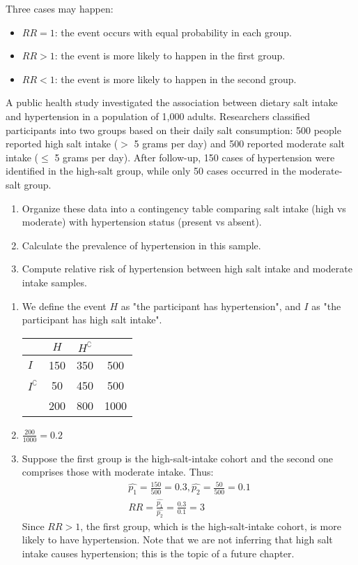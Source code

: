Three cases may happen:
\begin{itemize}
	\item \( RR = 1 \): the event occurs with equal probability in each group.
	\item \( RR > 1 \): the event is more likely to happen in the first group.
	\item \( RR < 1 \): the event is more likely to happen in the second group.
\end{itemize}

\begin{exmp}
	A public health study investigated the association between dietary salt intake and hypertension in a population of 1,000 adults.
	Researchers classified participants into two groups based on their daily salt consumption:
	500 people reported high salt intake (\(>\) 5 grams per day) and 500 reported moderate salt intake (\(\leq\) 5 grams per day).
	After follow-up, 150 cases of hypertension were identified in the high-salt group,
	while only 50 cases occurred in the moderate-salt group.
	\begin{enumerate}
		\item Organize these data into a contingency table comparing salt intake (high vs moderate) with hypertension status (present vs absent).
		\item Calculate the prevalence of hypertension in this sample.
		\item Compute relative risk of hypertension between high salt intake and moderate intake samples.
	\end{enumerate}
\end{exmp}
\begin{solution}
	\begin{enumerate}
        \item We define the event \( H \) as "the participant has hypertension", and \( I \) as "the participant has high salt intake".
		\begin{center}
		\begin{tabular}{l|cc|c}
							& \( H \) & \( H^\complement \) &  \\ \hline
		\( I \)                & 150 & 350 & 500\\ 
		\( I^\complement \)    & 50 & 450 & 500 \\ \hline
							& 200 & 800 & 1000
		\end{tabular}
		\end{center}
		\item \( \frac{200}{1000} = 0.2 \)
		\item Suppose the first group is the high-salt-intake cohort and the second one comprises those with moderate intake. Thus:
		\begin{gather*}
			\hat{p_1} = \frac{150}{500} = 0.3, \hat{p_2} = \frac{50}{500} = 0.1\\
			RR = \frac{\hat{p_1}}{\hat{p_2}} = \frac{0.3}{0.1} = 3
		\end{gather*}
		Since \( RR > 1 \), the first group, which is the high-salt-intake cohort, is more likely to have hypertension.
		Note that we are not inferring that high salt intake causes hypertension;
		this is the topic of a future chapter.
	\end{enumerate}
\end{solution}